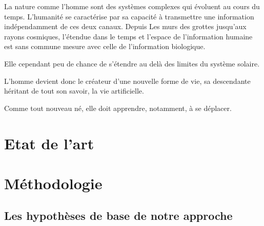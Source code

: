 \documentclass[journal, a4paper]{IEEEtran}
\begin{document}
	La nature comme l'homme sont des systèmes complexes qui évoluent au cours du temps.
	L'humanité se caractérise par sa capacité à transmettre une
	information indépendamment de ces deux canaux. Depuis Les murs
	des grottes jusqu'aux rayons cosmiques, l'étendue dans le temps et
	l'espace de l'information humaine est sans commune mesure avec
	celle de l'information biologique.

	Elle cependant peu de chance de s'étendre au delà des limites du
	système solaire.

	L'homme devient donc le créateur d'une nouvelle forme de vie, sa
	descendante héritant de tout son savoir,
	la vie artificielle.

	Comme tout nouveau né, elle doit apprendre, notamment, à se
	déplacer.


\section{Etat de l'art}



\section{Méthodologie}\label{sec:met}
	\subsection{Les hypothèses de base de notre approche}
\end{document}

